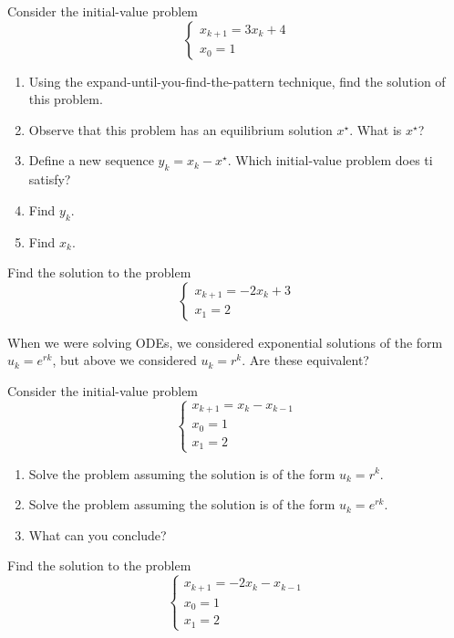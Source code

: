 \begin{exercises}

	\begin{problist}
	\prob Consider the initial-value problem
	$$ 	\begin{cases}
			 x_{k+1} = 3 x_k + 4 \\
			 x_0 = 1
 		\end{cases} $$
 	\begin{enumerate}
 		\item Using the expand-until-you-find-the-pattern technique, find the solution of this problem.
 		\item Observe that this problem has an equilibrium solution $x^\star$. What is $x^\star$?
 		\item Define a new sequence $y_k = x_k - x^\star$. Which initial-value problem does ti satisfy?
 		\item Find $y_k$.
 		\item Find $x_k$.
 	\end{enumerate}

	\prob Find the solution to the problem
	$$ 	\begin{cases}
			 x_{k+1} = -2x_{k} +3 \\
			 x_1 = 2
 		\end{cases} $$

	\prob When we were solving ODEs, we considered exponential solutions of the form $u_k = e^{rk}$, but above we considered $u_k = r^k$. Are these equivalent?
	
	Consider the initial-value problem
	$$ 	\begin{cases}
			 x_{k+1} = x_{k} - x_{k-1} \\
			 x_0 = 1 \\
			 x_1 = 2
 		\end{cases} $$

	\begin{enumerate}
		\item Solve the problem assuming the solution is of the form $u_k = r^k$.
		\item Solve the problem assuming the solution is of the form $u_k=e^{rk}$.
		\item What can you conclude?
	\end{enumerate}


	\prob Find the solution to the problem
	$$ 	\begin{cases}
			 x_{k+1} = -2x_{k} - x_{k-1} \\
			 x_0 = 1 \\
			 x_1 = 2
 		\end{cases} $$
	

\end{problist}
\end{exercises}
